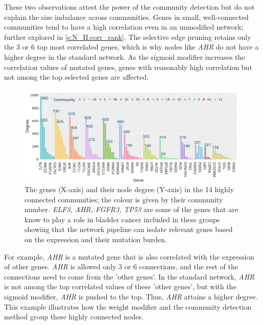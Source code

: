 These two observations attest the power of the community detection but do not explain the size imbalance across communities. Genes in small, well-connected communities tend to have a high correlation even in an unmodified network; further explored in \cref{s:N_II:corr_rank}. The selective edge pruning retains only the 3 or 6 top most correlated genes, which is why nodes like \textit{AHR} do not have a higher degree in the standard network. As the sigmoid modifier increases the correlation values of mutated genes, genes with reasonably high correlation but not among the top selected genes are affected.

\begin{figure}[!t]    
    \centering
    \includegraphics[width=1.0\textwidth,height=1.0\textheight,keepaspectratio]{Sections/Network_II/resources/reward/SmallCom_gene_labeled.png}
    \caption{The genes (X-axis) and their node degree (Y-axis) in the 14 highly connected communities; the colour is given by their community number. \textit{ELF3, AHR, FGFR3, TP53} are some of the genes that are know to play a role in bladder cancer \citet{Robertson2017-mg} included in these groups showing that the network pipeline can isolate relevant genes based on the expression and their mutation burden.}
    \label{fig:N_II:genes_highConn}
\end{figure}


For example, \textit{AHR} is a mutated gene that is also correlated with the expression of other genes. \textit{AHR} is allowed only 3 or 6 connections, and the rest of the connections need to come from the 'other genes'. In the standard network, \textit{AHR} is not among the top correlated values of these 'other genes', but with the sigmoid modifier, \textit{AHR} is pushed to the top. Thus, \textit{AHR} attains a higher degree. This example illustrates how the weight modifier and the community detection method group these highly connected nodes.

